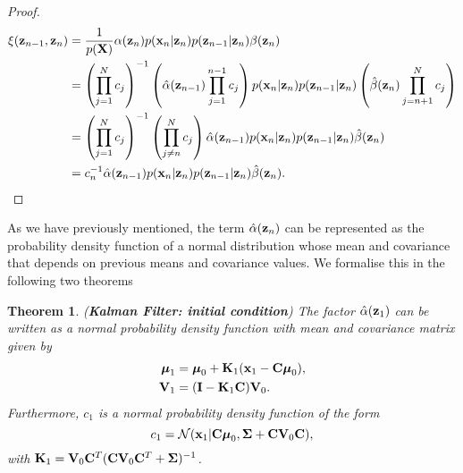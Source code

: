 \documentclass[11pt]{article}
\numberwithin{equation}{section}
\newcommand{\x}{{\bf x}}
\newcommand{\z}{{\bf z}}
\newcommand{\N}{\mathcal{N}}
\newtheorem{theorem}{Theorem}[section]
\begin{document}
\begin{proof}
	\begin{align}
		\xi(\z_{n-1}, \z_n) &= \frac{1}{p({\bf X})} \alpha(\z_n) p(\x_n \vert \z_n) p(\z_{n-1} \vert \z_n) \beta(\z_n) \\
		&= \left(\prod_{j=1}^N c_j\right)^{-1} \left(\hat\alpha(\z_{n-1}) \prod_{j=1}^{n-1} c_j\right)p(\x_n \vert \z_n) p(\z_{n-1} \vert \z_n)\left(\hat\beta(\z_n) \prod_{j={n+1}}^N c_j\right) \\
		&= \left(\prod_{j=1}^N c_j\right)^{-1} \left(\prod_{j\neq n}^N c_j\right) \hat\alpha(\z_{n-1}) p(\x_n \vert \z_n) p(\z_{n-1} \vert \z_n) \hat\beta(\z_n)\\
		&= c_n^{-1}\hat\alpha(\z_{n-1}) p(\x_n \vert \z_n) p(\z_{n-1} \vert \z_n) \hat\beta(\z_n).
	\end{align}
\end{proof}


As we have previously mentioned, the term $\hat\alpha(\z_n)$ can be represented as the probability density function of a normal distribution whose mean and covariance that depends on previous means and covariance values. We formalise this in the following two theorems

\begin{theorem} (\textbf{Kalman Filter: initial condition}) \label{theorem:alpha-forward-equations-1}
	The factor $\hat\alpha(\z_1)$ can be written as a normal probability density function with mean and covariance matrix given by
	\begin{align}
		\boldsymbol{\mu}_1 &= \boldsymbol{\mu}_0 + {\bf K}_1(\x_1 -{\bf C}\boldsymbol\mu_0),\\
		{\bf V}_1 &=  ({\bf I} - {\bf K}_1{\bf C}){\bf V}_0.
	\end{align}
	Furthermore, $c_1$ is a normal probability density function of the form
	\begin{equation}
		c_1 = \N(\x_1\vert {\bf C}\boldsymbol\mu_0, \boldsymbol\Sigma + {\bf C} {\bf V}_0 {\bf C}),
	\end{equation}
	with ${\bf K}_1 = {\bf V}_0{\bf C}^T({\bf C} {\bf V}_0 {\bf C}^T + \boldsymbol\Sigma)^{-1}$.
\end{theorem}
\end{document}
